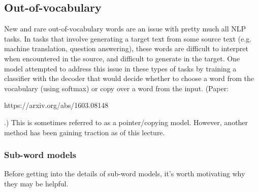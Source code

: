 \subsection{Out-of-vocabulary}
New and rare out-of-vocabulary words are an issue with pretty much all NLP tasks. In tasks that involve generating a target text from some source text (e.g. machine translation, question answering), these words are difficult to interpret when encountered in the source, and difficult to generate in the target. One model attempted to address this issue in these types of tasks by training a classifier with the decoder that would decide whether to choose a word from the vocabulary (using softmax) or copy over a word from the input. (Paper: \begin{tt}https://arxiv.org/abs/1603.08148\end{tt}.) This is sometimes referred to as a pointer/copying model. However, another method has been gaining traction as of this lecture.

\subsubsection{Sub-word models}
Before getting into the details of sub-word models, it's worth motivating why they may be helpful.

